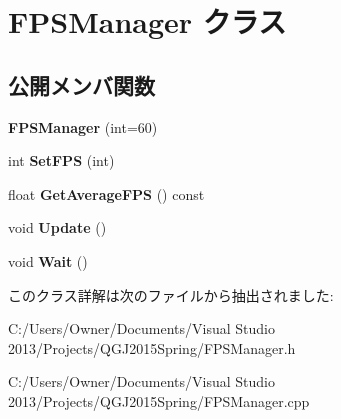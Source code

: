 \hypertarget{class_f_p_s_manager}{}\section{F\+P\+S\+Manager クラス}
\label{class_f_p_s_manager}
\subsection*{公開メンバ関数}
\begin{DoxyCompactItemize}
\item 
{\bfseries F\+P\+S\+Manager} (int=60)\hypertarget{class_f_p_s_manager_a5a56e214195cfb07bb0522207ffd1326}{}\label{class_f_p_s_manager_a5a56e214195cfb07bb0522207ffd1326}

\item 
int {\bfseries Set\+F\+PS} (int)\hypertarget{class_f_p_s_manager_a6100f4af096154e61d05f10e1b2f5006}{}\label{class_f_p_s_manager_a6100f4af096154e61d05f10e1b2f5006}

\item 
float {\bfseries Get\+Average\+F\+PS} () const \hypertarget{class_f_p_s_manager_a008a6d7ee1c56083061b177e0798859e}{}\label{class_f_p_s_manager_a008a6d7ee1c56083061b177e0798859e}

\item 
void {\bfseries Update} ()\hypertarget{class_f_p_s_manager_aa9f4b19b39da23ffc66cbf251a60b041}{}\label{class_f_p_s_manager_aa9f4b19b39da23ffc66cbf251a60b041}

\item 
void {\bfseries Wait} ()\hypertarget{class_f_p_s_manager_af3161b62f022d1ec1e383dfc4e0bd32e}{}\label{class_f_p_s_manager_af3161b62f022d1ec1e383dfc4e0bd32e}

\end{DoxyCompactItemize}


このクラス詳解は次のファイルから抽出されました\+:\begin{DoxyCompactItemize}
\item 
C\+:/\+Users/\+Owner/\+Documents/\+Visual Studio 2013/\+Projects/\+Q\+G\+J2015\+Spring/F\+P\+S\+Manager.\+h\item 
C\+:/\+Users/\+Owner/\+Documents/\+Visual Studio 2013/\+Projects/\+Q\+G\+J2015\+Spring/F\+P\+S\+Manager.\+cpp\end{DoxyCompactItemize}

